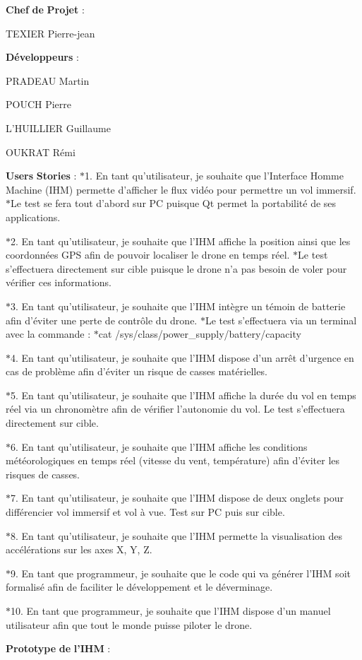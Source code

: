 {\bfseries Chef} {\bfseries de} {\bfseries Projet} \-:
\begin{DoxyItemize}
\item T\-E\-X\-I\-E\-R Pierre-\/jean
\end{DoxyItemize}

{\bfseries Développeurs} \-:
\begin{DoxyItemize}
\item P\-R\-A\-D\-E\-A\-U Martin
\item P\-O\-U\-C\-H Pierre
\item L'H\-U\-I\-L\-L\-I\-E\-R Guillaume
\item O\-U\-K\-R\-A\-T Rémi
\end{DoxyItemize}

{\bfseries Users} {\bfseries Stories} \-: $\ast$1. En tant qu'utilisateur, je souhaite que l'Interface Homme Machine (I\-H\-M) permette d'afficher le flux vidéo pour permettre un vol immersif. $\ast$\-Le test se fera tout d'abord sur P\-C puisque Qt permet la portabilité de ses applications.

$\ast$2. En tant qu'utilisateur, je souhaite que l'I\-H\-M affiche la position ainsi que les coordonnées G\-P\-S afin de pouvoir localiser le drone en temps réel. $\ast$\-Le test s'effectuera directement sur cible puisque le drone n'a pas besoin de voler pour vérifier ces informations.

$\ast$3. En tant qu'utilisateur, je souhaite que l'I\-H\-M intègre un témoin de batterie afin d'éviter une perte de contrôle du drone. $\ast$\-Le test s'effectuera via un terminal avec la commande \-: $\ast$cat /sys/class/power\-\_\-supply/battery/capacity

$\ast$4. En tant qu'utilisateur, je souhaite que l'I\-H\-M dispose d'un arrêt d'urgence en cas de problème afin d'éviter un risque de casses matérielles.

$\ast$5. En tant qu'utilisateur, je souhaite que l'I\-H\-M affiche la durée du vol en temps réel via un chronomètre afin de vérifier l'autonomie du vol. Le test s'effectuera directement sur cible.

$\ast$6. En tant qu'utilisateur, je souhaite que l'I\-H\-M affiche les conditions météorologiques en temps réel (vitesse du vent, température) afin d'éviter les risques de casses.

$\ast$7. En tant qu'utilisateur, je souhaite que l'I\-H\-M dispose de deux onglets pour différencier vol immersif et vol à vue. Test sur P\-C puis sur cible.

$\ast$8. En tant qu'utilisateur, je souhaite que l'I\-H\-M permette la visualisation des accélérations sur les axes X, Y, Z.

$\ast$9. En tant que programmeur, je souhaite que le code qui va générer l'I\-H\-M soit formalisé afin de faciliter le développement et le déverminage.

$\ast$10. En tant que programmeur, je souhaite que l'I\-H\-M dispose d'un manuel utilisateur afin que tout le monde puisse piloter le drone.

{\bfseries Prototype} {\bfseries de} {\bfseries l'I\-H\-M} \-:   